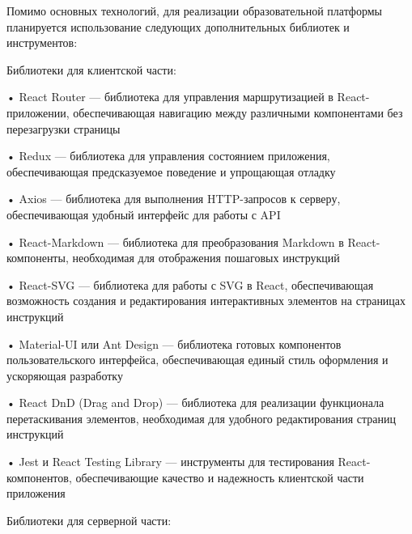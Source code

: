\subtitlespace

{\gostFont

  \par \redline Помимо основных технологий, для реализации образовательной платформы планируется использование следующих дополнительных библиотек и инструментов:

  \par \redline Библиотеки для клиентской части:

  \par \redline • React Router — библиотека для управления маршрутизацией в React-приложении, обеспечивающая навигацию между различными компонентами без перезагрузки страницы
  \par \redline • Redux — библиотека для управления состоянием приложения, обеспечивающая предсказуемое поведение и упрощающая отладку
  \par \redline • Axios — библиотека для выполнения HTTP-запросов к серверу, обеспечивающая удобный интерфейс для работы с API
  \par \redline • React-Markdown — библиотека для преобразования Markdown в React-компоненты, необходимая для отображения пошаговых инструкций
  \par \redline • React-SVG — библиотека для работы с SVG в React, обеспечивающая возможность создания и редактирования интерактивных элементов на страницах инструкций
  \par \redline • Material-UI или Ant Design — библиотека готовых компонентов пользовательского интерфейса, обеспечивающая единый стиль оформления и ускоряющая разработку
  \par \redline • React DnD (Drag and Drop) — библиотека для реализации функционала перетаскивания элементов, необходимая для удобного редактирования страниц инструкций
  \par \redline • Jest и React Testing Library — инструменты для тестирования React-компонентов, обеспечивающие качество и надежность клиентской части приложения

  \par \redline Библиотеки для серверной части:

}

